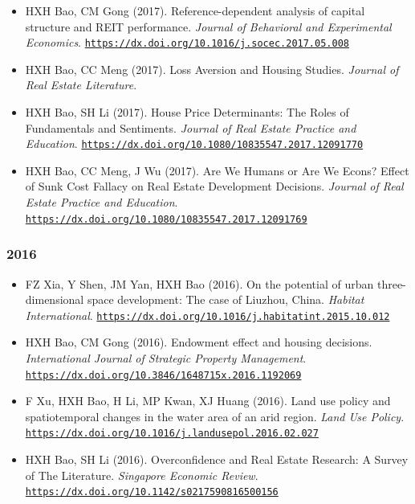 \documentclass[11pt,a4paper]{article}
\providecommand{\tightlist}{%
  \setlength{\itemsep}{1pt}\setlength{\parskip}{0pt}}
\begin{document}
\begin{itemize}
\tightlist
\item
  HXH Bao, CM Gong (2017). Reference-dependent analysis of capital
  structure and REIT performance. \emph{Journal of Behavioral and
  Experimental Economics}.
  \href{https://dx.doi.org/10.1016/j.socec.2017.05.008}{\nolinkurl{https://dx.doi.org/10.1016/j.socec.2017.05.008}}
\item
  HXH Bao, CC Meng (2017). Loss Aversion and Housing Studies.
  \emph{Journal of Real Estate Literature}.
\item
  HXH Bao, SH Li (2017). House Price Determinants: The Roles of
  Fundamentals and Sentiments. \emph{Journal of Real Estate Practice and
  Education}.
  \href{https://dx.doi.org/10.1080/10835547.2017.12091770}{\nolinkurl{https://dx.doi.org/10.1080/10835547.2017.12091770}}
\item
  HXH Bao, CC Meng, J Wu (2017). Are We Humans or Are We Econs? Effect
  of Sunk Cost Fallacy on Real Estate Development Decisions.
  \emph{Journal of Real Estate Practice and Education}.
  \href{https://dx.doi.org/10.1080/10835547.2017.12091769}{\nolinkurl{https://dx.doi.org/10.1080/10835547.2017.12091769}}
\end{itemize}

\subsubsection{2016}\label{section-10}

\begin{itemize}
\tightlist
\item
  FZ Xia, Y Shen, JM Yan, HXH Bao (2016). On the potential of urban
  three-dimensional space development: The case of Liuzhou, China.
  \emph{Habitat International}.
  \href{https://dx.doi.org/10.1016/j.habitatint.2015.10.012}{\nolinkurl{https://dx.doi.org/10.1016/j.habitatint.2015.10.012}}
\item
  HXH Bao, CM Gong (2016). Endowment effect and housing decisions.
  \emph{International Journal of Strategic Property Management}.
  \href{https://dx.doi.org/10.3846/1648715x.2016.1192069}{\nolinkurl{https://dx.doi.org/10.3846/1648715x.2016.1192069}}
\item
  F Xu, HXH Bao, H Li, MP Kwan, XJ Huang (2016). Land use policy and
  spatiotemporal changes in the water area of an arid region. \emph{Land
  Use Policy}.
  \href{https://dx.doi.org/10.1016/j.landusepol.2016.02.027}{\nolinkurl{https://dx.doi.org/10.1016/j.landusepol.2016.02.027}}
\item
  HXH Bao, SH Li (2016). Overconfidence and Real Estate Research: A
  Survey of The Literature. \emph{Singapore Economic Review}.
  \href{https://dx.doi.org/10.1142/s0217590816500156}{\nolinkurl{https://dx.doi.org/10.1142/s0217590816500156}}
\end{itemize}
\end{document}
